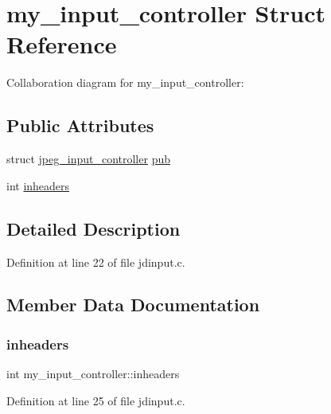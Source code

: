\hypertarget{structmy__input__controller}{}\section{my\+\_\+input\+\_\+controller Struct Reference}
\label{structmy__input__controller}


Collaboration diagram for my\+\_\+input\+\_\+controller\+:
\subsection*{Public Attributes}
\begin{DoxyCompactItemize}
\item 
struct \mbox{\hyperlink{structjpeg__input__controller}{jpeg\+\_\+input\+\_\+controller}} \mbox{\hyperlink{structmy__input__controller_a4ccad4a8586a7c91d0d71b45d0e78514}{pub}}
\item 
int \mbox{\hyperlink{structmy__input__controller_a722193efbf3a95d55c75c027be93fd31}{inheaders}}
\end{DoxyCompactItemize}


\subsection{Detailed Description}


Definition at line 22 of file jdinput.\+c.



\subsection{Member Data Documentation}
\mbox{\label{structmy__input__controller_a722193efbf3a95d55c75c027be93fd31}} 
\subsubsection{\texorpdfstring{inheaders}{inheaders}}
{\footnotesize\ttfamily int my\+\_\+input\+\_\+controller\+::inheaders}



Definition at line 25 of file jdinput.\+c.

\mbox{\label{structmy__input__controller_a4ccad4a8586a7c91d0d71b45d0e78514}} 
